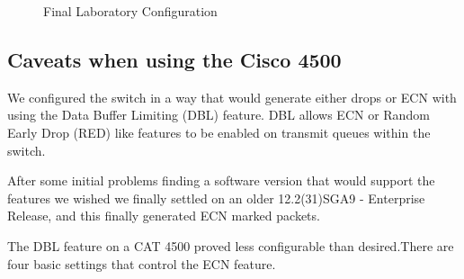 \documentclass[12pt]{article}
\begin{document}
\begin{figure}[h]
\centering
{}
\caption{Final Laboratory Configuration }
\label{fig:labconfig}
\end{figure}




\subsection{Caveats when using the Cisco 4500}

We configured the switch in a way that would generate either drops
or ECN with using the Data Buffer Limiting (DBL) feature. DBL allows ECN or Random Early
Drop (RED) like features to be enabled on transmit queues within the switch.

After some initial problems finding a software version that would
support the features we wished we finally settled on an older
12.2(31)SGA9 - Enterprise Release, and this finally generated
ECN marked packets.

The DBL feature on a CAT 4500 proved less configurable than desired.There are four
basic settings that control the ECN feature. 
\end{document}
